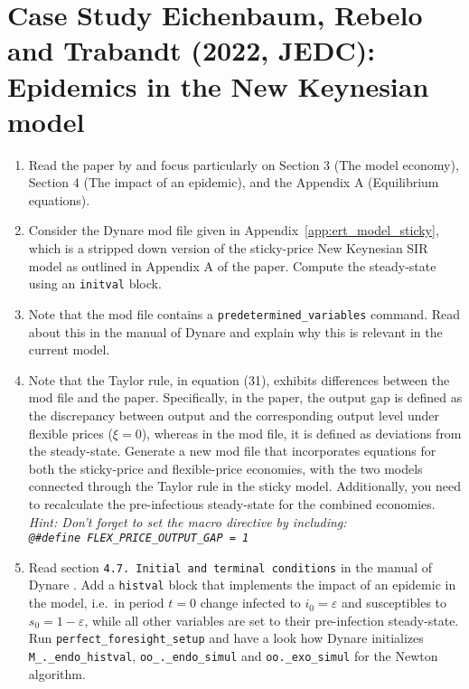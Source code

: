 \section[Case Study Eichenbaum, Rebelo and Trabandt (2022, JEDC): Epidemics in the New Keynesian model]{Case Study Eichenbaum, Rebelo and Trabandt (2022, JEDC): Epidemics in the New Keynesian model\label{ex:CaseStudy.Eichenbaum.Rebelo.Trabandt.2022}}

\begin{enumerate}
\item
Read the paper by \textcite{Eichenbaum.Rebelo.Trabandt_2022_EpidemicsNewKeynesian}
  and focus particularly on Section 3 (The model economy), Section 4 (The impact of an epidemic), and the Appendix A (Equilibrium equations).

\item
Consider the Dynare mod file given in Appendix~\ref{app:ert_model_sticky},
  which is a stripped down version of the sticky-price New Keynesian SIR model as outlined in Appendix A of the paper.
Compute the steady-state using an \texttt{initval} block.

\item
Note that the mod file contains a \texttt{predetermined\_variables} command.
Read about this in the manual of Dynare \parencite{Adjemian.Bastani.Juillard.EtAl_2022_DynareReferenceManual}
  and explain why this is relevant in the current model.

\item
Note that the Taylor rule, in equation (31), exhibits differences between the mod file and the paper.
Specifically, in the paper, the output gap is defined as the discrepancy between output and the corresponding output level under flexible prices (\(\xi=0\)),
  whereas in the mod file, it is defined as deviations from the steady-state.
Generate a new mod file that incorporates equations for both the sticky-price and flexible-price economies,
  with the two models connected through the Taylor rule in the sticky model.
Additionally, you need to recalculate the pre-infectious steady-state for the combined economies.
\emph{Hint: Don't forget to set the macro directive by including:\\ \texttt{@\#define FLEX\_PRICE\_OUTPUT\_GAP = 1}}

\item
Read section \texttt{4.7. Initial and terminal conditions} in the manual of Dynare \parencite{Adjemian.Bastani.Juillard.EtAl_2022_DynareReferenceManual}.
Add a \texttt{histval} block that implements the impact of an epidemic in the model,
  i.e.\ in period \(t=0\) change infected to \(i_0=\varepsilon \) and susceptibles to \(s_0=1-\varepsilon \),
  while all other variables are set to their pre-infection steady-state.
Run \texttt{perfect\_foresight\_setup} and have a look how Dynare initializes \texttt{M\_.\_endo\_histval},
  \texttt{oo\_.\_endo\_simul} and \texttt{oo.\_exo\_simul} for the Newton algorithm.


\end{enumerate}
